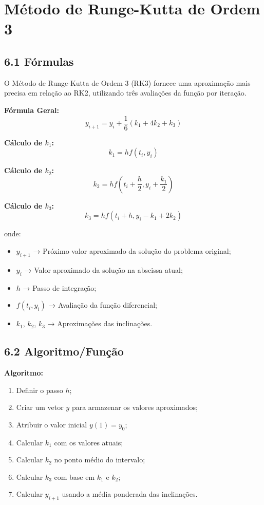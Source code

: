 \chapter{Método de Runge-Kutta de Ordem 3}

\section*{6.1 Fórmulas}

O Método de Runge-Kutta de Ordem 3 (RK3) fornece uma aproximação mais precisa em relação ao RK2, utilizando três avaliações da função por iteração.

\textbf{Fórmula Geral:}
\begin{equation}
y_{i+1} = y_i + \frac{1}{6}(k_1 + 4k_2 + k_3)
\end{equation}

\textbf{Cálculo de $k_1$:}
\begin{equation}
k_1 = h f(t_i, y_i)
\end{equation}

\textbf{Cálculo de $k_2$:}
\begin{equation}
k_2 = h f\left(t_i + \frac{h}{2}, y_i + \frac{k_1}{2}\right)
\end{equation}

\textbf{Cálculo de $k_3$:}
\begin{equation}
k_3 = h f(t_i + h, y_i - k_1 + 2k_2)
\end{equation}

onde:
\begin{itemize}
    \item $y_{i+1}$ → Próximo valor aproximado da solução do problema original;
    \item $y_i$ → Valor aproximado da solução na abscissa atual;
    \item $h$ → Passo de integração;
    \item $f(t_i, y_i)$ → Avaliação da função diferencial;
    \item $k_1$, $k_2$, $k_3$ → Aproximações das inclinações.
\end{itemize}

\section*{6.2 Algoritmo/Função}

\textbf{Algoritmo:}
\begin{enumerate}
    \item Definir o passo $h$;
    \item Criar um vetor $y$ para armazenar os valores aproximados;
    \item Atribuir o valor inicial $y(1) = y_0$;
    \item Calcular $k_1$ com os valores atuais;
    \item Calcular $k_2$ no ponto médio do intervalo;
    \item Calcular $k_3$ com base em $k_1$ e $k_2$;
    \item Calcular $y_{i+1}$ usando a média ponderada das inclinações.
\end{enumerate}

